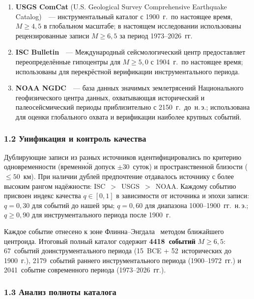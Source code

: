 \documentclass[12pt,a4paper]{article}
\begin{document}
\begin{enumerate}[leftmargin=*,label=(\arabic*)]

\item \textbf{USGS ComCat} (U.S. Geological Survey Comprehensive Earthquake
Catalog)~\cite{USGS2023}~--- инструментальный каталог с 1900~г.\ по настоящее
время, $M\geq4{,}5$ в глобальном масштабе; в настоящем исследовании
использованы рецензированные записи $M\geq6{,}5$ за период 1973--2026~гг.

\item \textbf{ISC Bulletin}~\cite{ISC2023,Storchak2013}~--- Международный
сейсмологический центр предоставляет переопределённые гипоцентры для
$M\geq5{,}0$ с 1904~г.\ по настоящее время; использованы для перекрёстной
верификации инструментального периода.

\item \textbf{NOAA NGDC}~\cite{NOAA2023}~--- база данных значимых землетрясений
Национального геофизического центра данных, охватывающая исторический и
палеосейсмический периоды приблизительно с 2150~г.\ до~н.\,э.; использована
для оценки глобального охвата и верификации наиболее крупных событий.

\end{enumerate}

\subsubsection*{1.2 Унификация и контроль качества}

Дублирующие записи из разных источников идентифицировались по критерию
одновременности (временн\'{о}й допуск $\pm30$~суток) и пространственной близости
($\leq50$~км). При наличии дублей предпочтение отдавалось источнику с более
высоким рангом надёжности: ISC~$>$~USGS~$>$~NOAA. Каждому событию присвоен
индекс качества $q\in[0{,}1]$ в зависимости от источника и эпохи записи:
$q=0{,}30$ для событий до нашей эры; $q=0{,}60$ для диапазона 1000--1900~гг.\
н.\,э.; $q\geq0{,}90$ для инструментального периода после 1900~г.

Каждое событие отнесено к зоне Флинна--Энгдала~\cite{Young1996} методом
ближайшего центроида. Итоговый полный каталог содержит \textbf{4418~событий} $M\geq6{,}5$:
67~событий доинструментального периода (15~BCE + 52~исторических до 1900~г.),
2179~событий раннего инструментального периода (1900--1972~гг.)
и 2041~событие современного периода (1973--2026~гг.).

\subsubsection*{1.3 Анализ полноты каталога}
\end{document}
